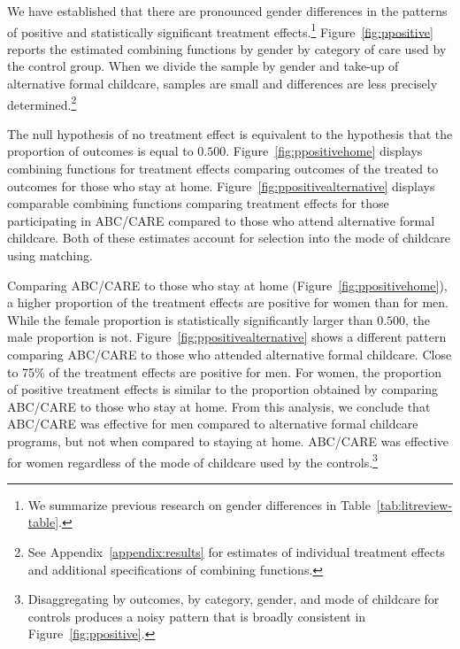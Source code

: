 We have established that there are pronounced gender differences in the patterns of positive and statistically significant treatment effects.\footnote{We summarize previous research on gender differences in Table~\ref{tab:litreview-table}.} Figure~\ref{fig:ppositive} reports the estimated combining functions by gender by category of care used by the control group. When we divide the sample by gender and take-up of alternative formal childcare, samples are small and differences are less precisely determined.\footnote{See Appendix~\ref{appendix:results} for estimates of individual treatment effects and additional specifications of combining functions.}

The null hypothesis  of no treatment effect is equivalent to the hypothesis that the proportion of outcomes is equal to $0.500$. Figure~\ref{fig:ppositivehome} displays combining functions for treatment effects comparing outcomes of the treated to outcomes for those who stay at home. Figure~\ref{fig:ppositivealternative} displays comparable combining functions comparing treatment effects for those participating in ABC/CARE compared to those who attend alternative formal childcare. Both of these estimates account for selection into the mode of childcare using matching.

Comparing ABC/CARE to those who stay at home (Figure~\ref{fig:ppositivehome}), a higher proportion of the treatment effects are positive for women than for men. While the female proportion is statistically significantly larger than $0.500$, the male proportion is not. Figure~\ref{fig:ppositivealternative} shows a different pattern comparing ABC/CARE to those who attended alternative formal childcare. Close to 75\% of the treatment effects are positive for men. For women, the proportion of positive treatment effects is similar to the proportion obtained by comparing ABC/CARE to those who stay at home. From this analysis, we conclude that ABC/CARE was effective for men compared to alternative formal childcare programs, but not when compared to staying at home. ABC/CARE was effective for women regardless of the mode of childcare used by the controls.\footnote{Disaggregating by outcomes, by category, gender, and mode of childcare for controls produces a noisy pattern that is broadly consistent in Figure~\ref{fig:ppositive}.}

